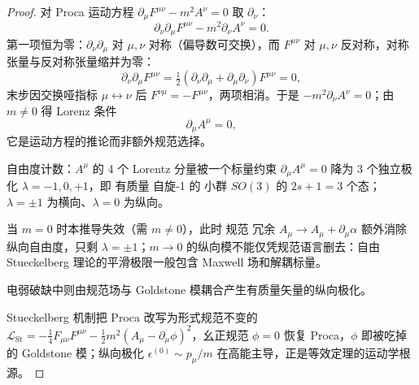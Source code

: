 \begin{proof}
对 Proca 运动方程 $\partial_\mu F^{\mu\nu}-m^2A^\nu=0$ 取 $\partial_\nu$：
\begin{equation*}
\partial_\nu\partial_\mu F^{\mu\nu}-m^2\partial_\nu A^\nu=0.
\end{equation*}
第一项恒为零：$\partial_\nu\partial_\mu$ 对 $\mu,\nu$ 对称（偏导数可交换），而 $F^{\mu\nu}$ 对 $\mu,\nu$ 反对称，对称张量与反对称张量缩并为零：
\begin{equation*}
\partial_\nu\partial_\mu F^{\mu\nu}
=\tfrac12(\partial_\nu\partial_\mu+\partial_\mu\partial_\nu)F^{\mu\nu}=0,
\end{equation*}
末步因交换哑指标 $\mu\leftrightarrow\nu$ 后 $F^{\nu\mu}=-F^{\mu\nu}$，两项相消。于是 $-m^2\partial_\nu A^\nu=0$；由 $m\neq0$ 得 Lorenz 条件
\begin{equation*}
\partial_\mu A^\mu=0,
\end{equation*}
它是运动方程的推论而非额外规范选择。

自由度计数：$A^\mu$ 的 4 个 Lorentz 分量被一个标量约束 $\partial_\mu A^\mu=0$ 降为 3 个独立极化 $\lambda=-1,0,+1$，即 有质量 自旋-1 的 小群 $SO(3)$ 的 $2s+1=3$ 个态；$\lambda=\pm1$ 为横向、$\lambda=0$ 为纵向。

当 $m=0$ 时本推导失效（需 $m\neq0$），此时 规范 冗余 $A_\mu\to A_\mu+\partial_\mu\alpha$ 额外消除纵向自由度，只剩 $\lambda=\pm1$；$m\to0$ 的纵向模不能仅凭规范语言删去：自由 Stueckelberg 理论的平滑极限一般包含 Maxwell 场和解耦标量。

电弱破缺中则由规范场与 Goldstone 模耦合产生有质量矢量的纵向极化。

Stueckelberg 机制把 Proca 改写为形式规范不变的 $\mathcal{L}_{\mathrm{St}}=-\tfrac14F_{\mu\nu}F^{\mu\nu}-\tfrac12m^2(A_\mu-\partial_\mu\phi)^2$，幺正规范 $\phi=0$ 恢复 Proca，$\phi$ 即被吃掉的 Goldstone 模；纵向极化 $\epsilon^{(0)}\sim p_\mu/m$ 在高能主导，正是等效定理的运动学根源。
\end{proof}
